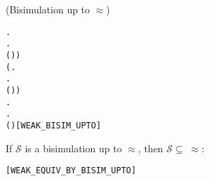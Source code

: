 \begin{definition}{(Bisimulation up to $\approx$)}
\begin{alltt}
           \HOLSymConst{\HOLTokenForall{}}.
                \HOLTokenTransBegin{} \HOLTokenTransEnd {} \HOLSymConst{\HOLTokenImp{}}
               \HOLSymConst{\HOLTokenExists{}}.
                    \HOLTokenWeakTransBegin{} \HOLTokenWeakTransEnd {} \HOLSymConst{\HOLTokenConj{}}
                   ( \HOLSymConst{\HOLTokenRCompose{}}  \HOLSymConst{\HOLTokenRCompose{}} )  ) \HOLSymConst{\HOLTokenConj{}}
      (\HOLSymConst{\HOLTokenForall{}}.
            \HOLTokenTransBegin\HOLSymConst{\ensuremath{\tau}}\HOLTokenTransEnd {} \HOLSymConst{\HOLTokenImp{}}
           \HOLSymConst{\HOLTokenExists{}}.
                \HOLSymConst{\HOLTokenEPS}  \HOLSymConst{\HOLTokenConj{}}
               ( \HOLSymConst{\HOLTokenRCompose{}}  \HOLSymConst{\HOLTokenRCompose{}} )  ) \HOLSymConst{\HOLTokenConj{}}
      \HOLSymConst{\HOLTokenForall{}}.
           \HOLTokenTransBegin\HOLSymConst{\ensuremath{\tau}}\HOLTokenTransEnd {} \HOLSymConst{\HOLTokenImp{}}
          \HOLSymConst{\HOLTokenExists{}}.
               \HOLSymConst{\HOLTokenEPS}  \HOLSymConst{\HOLTokenConj{}} ( \HOLSymConst{\HOLTokenRCompose{}}  \HOLSymConst{\HOLTokenRCompose{}} )  \hfill{[WEAK_BISIM_UPTO]}
\end{alltt}
\end{definition}

\begin{theorem}
If $\mathcal{S}$ is a bisimulation up to $\approx$, then
$\mathcal{S} \subseteq\;\approx$:
\begin{alltt}
\HOLTokenTurnstile{}   \HOLSymConst{\HOLTokenConj{}}    \HOLSymConst{\HOLTokenImp{}}  \HOLSymConst{\HOLTokenWeakEQ} \hfill{[WEAK_EQUIV_BY_BISIM_UPTO]}
\end{alltt}
\end{theorem}

